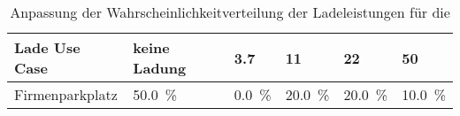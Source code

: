 {
\renewcommand{\arraystretch}{1.2}%
\begin{table}[H]
	\begin{center}
		\caption{Anpassung der Wahrscheinlichkeitverteilung der Ladeleistungen für die \SzeFirmenparkplatzdot}
		\begin{tabu} to \textwidth {X[1.7] X[1.3, r] X[1, r] X[1, r] X[1, r] X[1, r]}
			\hline
			Lade Use Case   & keine Ladung        & \SI{3.7}{\kw}      & \SI{11}{\kw}        & \SI{22}{\kw}        & \SI{50}{\kw}        \\ \hline
			Firmenparkplatz & \SI{50.0}{\percent} & \SI{0.0}{\percent} & \SI{20.0}{\percent} & \SI{20.0}{\percent} & \SI{10.0}{\percent} \\ \hline
		\end{tabu}
		\label{tab:UCProbabilitySzenarette}
	\end{center}
	\vspace{-3mm}%
\end{table}
}
